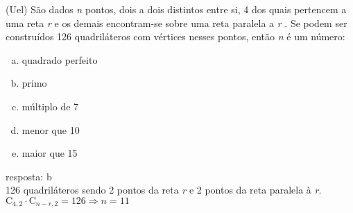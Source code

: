 \begin{ex}
 (Uel) São dados \textit{n} pontos, dois a dois distintos entre si, 4 dos quais pertencem a uma reta \textit{r} e os demais encontram-se sobre uma reta paralela a \textit{r} . Se podem ser construídos 126 quadriláteros com vértices nesses pontos, então \textit{n} é um número:
    \begin{enumerate}[(a)]
    \item quadrado perfeito
    \item primo
    \item múltiplo de 7
    \item menor que 10
    \item maior que 15
    \end{enumerate}
      \begin{sol}
       resposta: b \\
       126 quadriláteros sendo 2 pontos da reta \textit{r} e 2 pontos da reta paralela à \textit{r}. \\
       $\mathrm{C}_{4,2}\cdot\mathrm{C}_{{n-r},2}=126 \Longrightarrow n=11$
      \end{sol}
\end{ex}